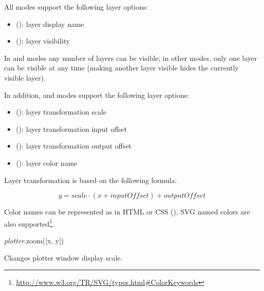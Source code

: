 \documentclass[a4paper,12pt,twoside,extrafontsizes]{memoir}
\begin{document}
\begin{funcremarks}
	All modes support the following layer options:
	
	\begin{itemize}
		\item {} (): layer display name
		\item {} (): layer visibility
	\end{itemize}
	
	In  and  modes any number of layers can be visible; in other modes, only one layer can be visible at any time (making another layer visible hides the currently visible layer).
	
	In addition,  and  modes support the following layer options:
	
	\begin{itemize}
		\item {} (): layer transformation scale
		\item {} (): layer transformation input offset
		\item {} (): layer transformation output offset
		\item {} (): layer color name
	\end{itemize}

	Layer transformation is based on the following formula:
	
\begin{displaymath}
y = \mathit{scale} \cdot (x + \mathit{inputOffset}) + \mathit{outputOffset}
\end{displaymath}
	
	Color names can be represented as in HTML or CSS (), SVG named colors are also supported\footnote{\url{http://www.w3.org/TR/SVG/types.html\#ColorKeywords}}.
\end{funcremarks}


\begin{luafuncprototype}
\emph{plotter}.zoom([x, y])
\end{luafuncprototype}

\begin{funcdescr}
	Changes plotter window display scale.
\end{funcdescr}
\end{document}
